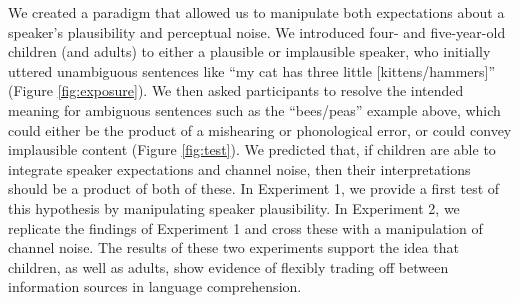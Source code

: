 \documentclass[man,floatsintext]{apa6}
\begin{document}
We created a paradigm that allowed us to manipulate both expectations about a speaker's plausibility and perceptual noise. We introduced four- and five-year-old children (and adults) to either a plausible or implausible speaker, who initially uttered unambiguous sentences like ``my cat has three little [kittens/hammers]'' (Figure \ref{fig:exposure}). We then asked participants to resolve the intended meaning for ambiguous sentences such as the ``bees/peas'' example above, which could either be the product of a mishearing or phonological error, or could convey implausible content (Figure \ref{fig:test}). We predicted that, if children are able to integrate speaker expectations and channel noise, then their interpretations should be a product of both of these. In Experiment 1, we provide a first test of this hypothesis by manipulating speaker plausibility. In Experiment 2, we replicate the findings of Experiment 1 and cross these with a manipulation of channel noise. The results of these two experiments support the idea that children, as well as adults, show evidence of flexibly trading off between information sources in language comprehension.
\end{document}
